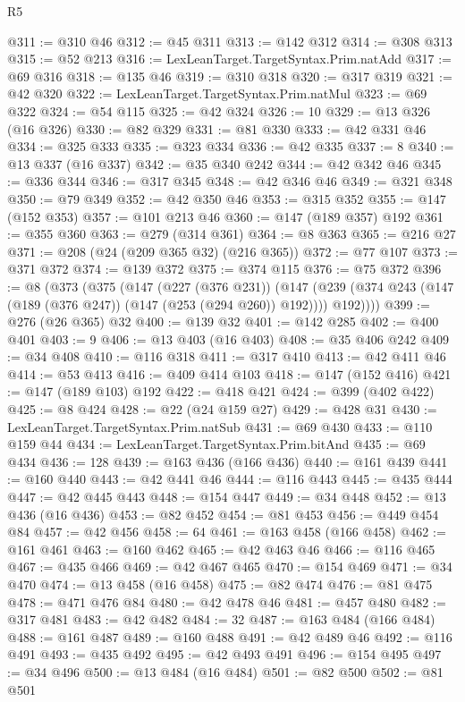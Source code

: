 \begin{lexlean}{R5}
\begin{coremodule}
{{{{{{{{{{{{{{{{{{{@311 := @310 @46
@312 := @45 @311
@313 := @142 @312
@314 := @308 @313
@315 := @52 @213
@316 := LexLeanTarget.TargetSyntax.Prim.natAdd
@317 := @69 @316
@318 := @135 @46
@319 := @310 @318
@320 := @317 @319
@321 := @42 @320
@322 := LexLeanTarget.TargetSyntax.Prim.natMul
@323 := @69 @322
@324 := @54 @115
@325 := @42 @324
@326 := 10
@329 := @13 @326 (@16 @326)
@330 := @82 @329
@331 := @81 @330
@333 := @42 @331 @46
@334 := @325 @333
@335 := @323 @334
@336 := @42 @335
@337 := 8
@340 := @13 @337 (@16 @337)
@342 := @35 @340 @242
@344 := @42 @342 @46
@345 := @336 @344
@346 := @317 @345
@348 := @42 @346 @46
@349 := @321 @348
@350 := @79 @349
@352 := @42 @350 @46
@353 := @315 @352
@355 := @147 (@152 @353)
@357 := @101 @213 @46
@360 := @147 (@189 @357) @192
@361 := @355 @360
@363 := @279 (@314 @361)
@364 := @8 @363
@365 := @216 @27
@371 := @208 (@24 (@209 @365 @32) (@216 @365))
@372 := @77 @107
@373 := @371 @372
@374 := @139 @372
@375 := @374 @115
@376 := @75 @372
@396 := @8
    (@373
      (@375
        (@147
          (@227 (@376 @231))
          (@147 (@239 (@374 @243 (@147 (@189 (@376 @247)) (@147 (@253 (@294 @260)) @192)))) @192))))
@399 := @276 (@26 @365) @32
@400 := @139 @32
@401 := @142 @285
@402 := @400 @401
@403 := 9
@406 := @13 @403 (@16 @403)
@408 := @35 @406 @242
@409 := @34 @408
@410 := @116 @318
@411 := @317 @410
@413 := @42 @411 @46
@414 := @53 @413
@416 := @409 @414 @103
@418 := @147 (@152 @416)
@421 := @147 (@189 @103) @192
@422 := @418 @421
@424 := @399 (@402 @422)
@425 := @8 @424
@428 := @22 (@24 @159 @27)
@429 := @428 @31
@430 := LexLeanTarget.TargetSyntax.Prim.natSub
@431 := @69 @430
@433 := @110 @159 @44
@434 := LexLeanTarget.TargetSyntax.Prim.bitAnd
@435 := @69 @434
@436 := 128
@439 := @163 @436 (@166 @436)
@440 := @161 @439
@441 := @160 @440
@443 := @42 @441 @46
@444 := @116 @443
@445 := @435 @444
@447 := @42 @445 @443
@448 := @154 @447
@449 := @34 @448
@452 := @13 @436 (@16 @436)
@453 := @82 @452
@454 := @81 @453
@456 := @449 @454 @84
@457 := @42 @456
@458 := 64
@461 := @163 @458 (@166 @458)
@462 := @161 @461
@463 := @160 @462
@465 := @42 @463 @46
@466 := @116 @465
@467 := @435 @466
@469 := @42 @467 @465
@470 := @154 @469
@471 := @34 @470
@474 := @13 @458 (@16 @458)
@475 := @82 @474
@476 := @81 @475
@478 := @471 @476 @84
@480 := @42 @478 @46
@481 := @457 @480
@482 := @317 @481
@483 := @42 @482
@484 := 32
@487 := @163 @484 (@166 @484)
@488 := @161 @487
@489 := @160 @488
@491 := @42 @489 @46
@492 := @116 @491
@493 := @435 @492
@495 := @42 @493 @491
@496 := @154 @495
@497 := @34 @496
@500 := @13 @484 (@16 @484)
@501 := @82 @500
@502 := @81 @501
}}}}}}}}}}}}}}}}}}}
\end{coremodule}
\end{lexlean}
